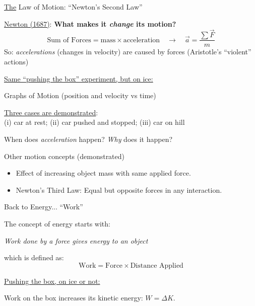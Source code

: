\documentclass[12pt]{beamer}
\begin{document}
\begin{frame}{\underline{The} Law of Motion: ``Newton's Second Law''}

\underline{Newton (1687)}: {\bf What makes it {\em change} its motion?}
	\begin{equation*}
	\text{Sum of Forces} = \text{mass} \times \text{acceleration} \quad \rightarrow \quad \vec{a} = \frac{\sum \vec{F}}{m}
	\end{equation*}
So: {\em accelerations} (changes in velocity) are caused by forces (Aristotle's ``violent'' actions)

\vspace{0.25cm}

\underline{Same ``pushing the box'' experiment, but on ice:}

\vspace{4cm}

\end{frame}
\begin{frame}{Graphs of Motion (position and velocity vs time)}

\underline{Three cases are demonstrated}:\\
(i) car at rest; (ii) car pushed and stopped; (iii) car on hill

\vspace{7cm}

When does {\em acceleration} happen?  {\em Why} does it happen?
\end{frame}
\begin{frame}{Other motion concepts (demonstrated)}

\begin{itemize}
\item Effect of increasing object mass with same applied force.
\item Newton's Third Law: Equal but opposite forces in any interaction.
\end{itemize}


\end{frame}
\begin{frame}{Back to Energy... ``Work''}

The concept of energy starts with:
	\begin{center}
	{\em Work done by a force gives energy to an object}
	\end{center}
which is defined as:
	\begin{equation*}
	\text{Work} = \text{Force} \times \text{Distance Applied}
	\end{equation*}
	
\vspace{0.25cm}

\underline{Pushing the box, on ice or not:}

\vspace{4cm}

Work on the box increases its kinetic energy: $ W = \Delta K$.

\end{frame}
\end{document}
